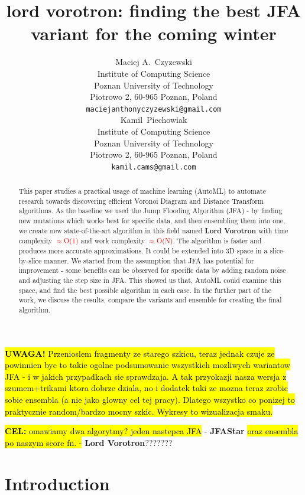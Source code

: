\documentclass{article}
\title{lord vorotron: finding the best JFA variant for the coming winter} %
\author{
  Maciej A.~Czyzewski\\
  Institute of Computing Science\\
  Poznan University of Technology\\
  Piotrowo 2, 60-965 Poznan, Poland\\
  \texttt{maciejanthonyczyzewski@gmail.com} \\
  \And
  Kamil~Piechowiak\\
  Institute of Computing Science\\
  Poznan University of Technology\\
  Piotrowo 2, 60-965 Poznan, Poland\\
  \texttt{kamil.cams@gmail.com} \\
}
\newcommand{\ourjfasingle}{JFAStar}
\newcommand{\ourjfa}{Lord Vorotron} %
\begin{document}

\maketitle

\hl{\textbf{UWAGA!} Przenioslem fragmenty ze starego szkicu, teraz jednak czuje ze
powinnien byc to takie ogolne podsumowanie wszystkich mozliwych wariantow JFA - i
w jakich przypadkach sie sprawdzaja. A tak przyokazji nasza wersja z szumem+trikami
ktora dobrze dziala, no i dodatek taki ze mozna teraz zrobic sobie ensembla (a
nie jako glowny cel tej pracy). Dlatego wszystko co ponizej to praktycznie
random/bardzo mocny szkic. Wykresy to wizualizacja smaku.}
\newline

\begin{abstract}
This paper studies a practical usage of machine learning (AutoML) to automate
research towards discovering efficient Voronoi Diagram and Distance Transform
algorithms.  As the baseline we used the Jump Flooding Algorithm (JFA) - by
finding new mutations which works best for specific data, and then ensembling
them into one, we create new state-of-the-art algorithm in this field named
\textbf{\ourjfa} \hspace{0.01cm} with time complexity \textcolor{red}{$\approx$O(1)} and
work complexity \textcolor{red}{$\approx$O(N)}.
The algorithm is faster and produces more accurate approximations. It could be
extended into 3D space in a slice-by-slice manner.  We started from the
assumption that JFA has potential for improvement - some benefits can be
observed for specific data by adding random noise and adjusting the step size in
JFA.  This showed us that, AutoML could examine this space, and find the best
possible algorithm in each case.  In the further part of the work, we discuss
the results, compare the variants and ensemble for creating the final algorithm.
\end{abstract}

\hl{\textbf{CEL:} omawiamy dwa algorytmy? jeden nastepca JFA} -
\textbf{\ourjfasingle} \hspace{0.01cm} \hl{oraz ensembla po naszym score fn. -}
\textbf{\ourjfa}???????


\section{Introduction} %
\end{document}
